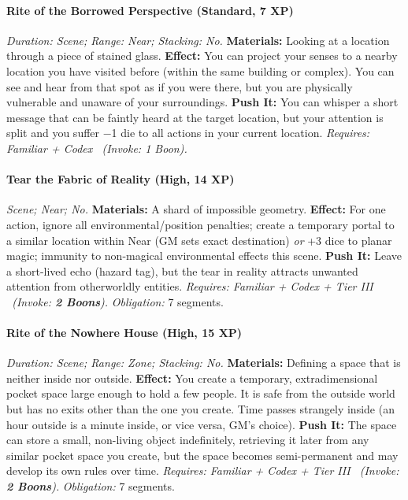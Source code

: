 \documentclass[12pt,twoside]{book}
\begin{document}
\paragraph{Rite of the Borrowed Perspective (Standard, 7 XP)} \emph{Duration: Scene; Range: Near; Stacking: No.}
\textbf{Materials:} Looking at a location through a piece of stained glass.
\textbf{Effect:} You can project your senses to a nearby location you have visited before (within the same building or complex). You can see and hear from that spot as if you were there, but you are physically vulnerable and unaware of your surroundings.
\textbf{Push It:} You can whisper a short message that can be faintly heard at the target location, but your attention is split and you suffer −1 die to all actions in your current location.
\emph{Requires: Familiar + Codex \ (\textit{Invoke:} 1 Boon).}
\paragraph{Tear the Fabric of Reality (High, 14 XP)} \emph{Scene; Near; No.}
\textbf{Materials:} A shard of impossible geometry.
\textbf{Effect:} For one action, ignore all environmental/position penalties; create a temporary portal to a similar location within Near (GM sets exact destination) \emph{or} +3 dice to planar magic; immunity to non-magical environmental effects this scene.
\textbf{Push It:} Leave a short-lived echo (hazard tag), but the tear in reality attracts unwanted attention from otherworldly entities.
\emph{Requires: Familiar + Codex + Tier III \ (\textit{Invoke:} \textbf{2 Boons}).}
\emph{Obligation:} 7 segments.

\paragraph{Rite of the Nowhere House (High, 15 XP)} \emph{Duration: Scene; Range: Zone; Stacking: No.}
\textbf{Materials:} Defining a space that is neither inside nor outside.
\textbf{Effect:} You create a temporary, extradimensional pocket space large enough to hold a few people. It is safe from the outside world but has no exits other than the one you create. Time passes strangely inside (an hour outside is a minute inside, or vice versa, GM's choice).
\textbf{Push It:} The space can store a small, non-living object indefinitely, retrieving it later from any similar pocket space you create, but the space becomes semi-permanent and may develop its own rules over time.
\emph{Requires: Familiar + Codex + Tier III \ (\textit{Invoke:} \textbf{2 Boons}).}
\emph{Obligation:} 7 segments.
\end{document}
